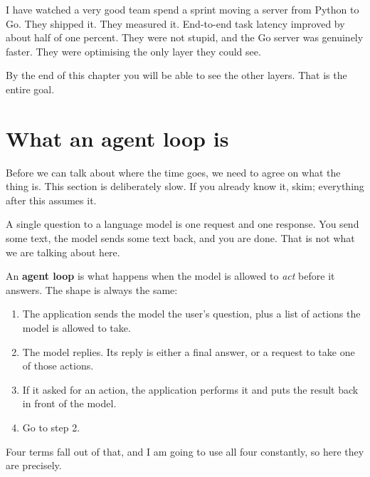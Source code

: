 I have watched a very good team spend a sprint moving a server from Python to
Go. They shipped it. They measured it. End-to-end task latency improved by about
half of one percent. They were not stupid, and the Go server was genuinely
faster. They were optimising the only layer they could see.

By the end of this chapter you will be able to see the other layers. That is
the entire goal.

\section{What an agent loop is}
\label{sec:what-is-a-loop}

Before we can talk about where the time goes, we need to agree on what the thing
is. This section is deliberately slow. If you already know it, skim; everything
after this assumes it.

A single question to a language model is one request and one response. You send
some text, the model sends some text back, and you are done. That is not what we
are talking about here.

An \textbf{agent loop} is what happens when the model is allowed to \emph{act}
before it answers. The shape is always the same:

\begin{enumerate}[leftmargin=1.6em, itemsep=4pt]
\item The application sends the model the user's question, plus a list of
      actions the model is allowed to take.
\item The model replies. Its reply is either a final answer, or a request to
      take one of those actions.
\item If it asked for an action, the application performs it and puts the result
      back in front of the model.
\item Go to step 2.
\end{enumerate}

Four terms fall out of that, and I am going to use all four constantly, so here
they are precisely.

